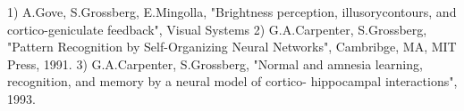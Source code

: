 \documentclass[12pt,a4paper,article]{article}
\begin{document}
1) A.Gove, S.Grossberg, E.Mingolla, "Brightness perception, illusorycontours, and cortico-geniculate feedback", Visual Systems 
2) G.A.Carpenter, S.Grossberg, "Pattern Recognition by Self-Organizing Neural Networks", Cambribge, MA, MIT Press, 1991. 
3) G.A.Carpenter, S.Grossberg, "Normal and amnesia learning, recognition, and memory by a neural model of cortico- hippocampal interactions", 1993.
\end{document}
